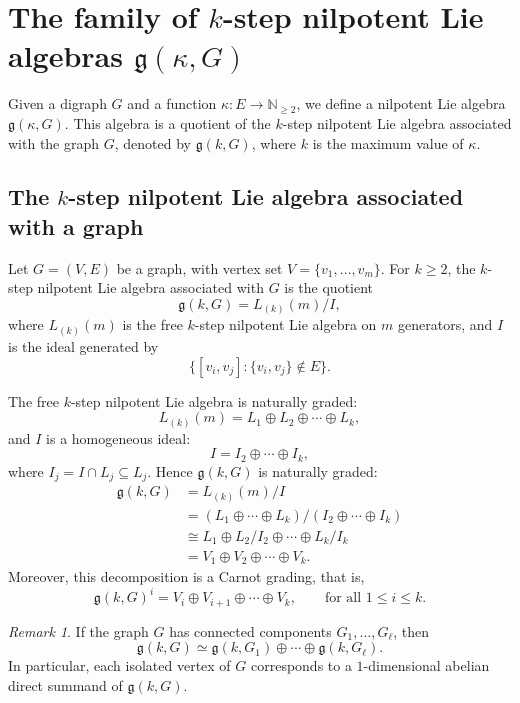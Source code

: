 \documentclass[a4paper,11pt]{amsart}
\theoremstyle{definition}
\theoremstyle{remark}
\newtheorem{remark}[theorem]{Remark}
\numberwithin{equation}{section}
\newcommand{\g}{\mathfrak{g}}
\newcommand{\N}{\mathbb{N}}
\begin{document}
\section{The family of $k$-step nilpotent Lie algebras $\g(\kappa,G)$}

Given a digraph $G$ and a function $\kappa:E\to\N_{\ge 2}$, we define a nilpotent Lie algebra $\g(\kappa,G)$. 
This algebra is a quotient of the $k$-step nilpotent Lie algebra associated with the graph $G$, denoted by $\g(k,G)$, 
where $k$ is the maximum value of $\kappa$.
\subsection{The $k$-step nilpotent Lie algebra associated with a graph}

Let $G=(V,E)$ be a graph, with vertex set $V=\{v_1,\dots,v_m\}$. For $k\ge 2$, the $k$-step nilpotent Lie algebra associated with $G$ is the quotient
\[
\g(k,G)=L_{(k)}(m)/I,
\]
where $L_{(k)}(m)$ is the free $k$-step nilpotent Lie algebra on $m$ generators, and $I$ is the ideal generated by
\[
\{[v_i,v_j]: \{v_i,v_j\}\notin E\}.
\]

The free $k$-step nilpotent Lie algebra is naturally graded:
\[
L_{(k)}(m)=L_1\oplus L_2\oplus\cdots\oplus L_k,
\]
and $I$ is a homogeneous ideal:
\[
I=I_2\oplus\cdots\oplus I_k,
\]
where $I_j=I\cap L_j\subseteq L_j$. Hence $\g(k,G)$ is naturally graded:
\[
\begin{aligned}
\g(k,G)&=L_{(k)}(m)/I\\
&=(L_1\oplus\cdots\oplus L_k)/(I_2\oplus\cdots\oplus I_k)\\
&\cong L_1\oplus L_2/I_2\oplus\cdots\oplus L_k/I_k\\
&=V_1\oplus V_2\oplus\cdots\oplus V_k.
\end{aligned}
\]
Moreover, this decomposition is a Carnot grading, that is,
\[
\g(k,G)^i = V_i\oplus V_{i+1}\oplus\cdots\oplus V_k,
\qquad \text{for all } 1\le i\le k.
\]

\begin{remark}
If the graph $G$ has connected components $G_1,\dots,G_\ell$, then
\[
\g(k,G)\simeq \g(k,G_1)\oplus\cdots\oplus\g(k,G_\ell).
\]
In particular, each isolated vertex of $G$ corresponds to a $1$-dimensional abelian direct summand of $\g(k,G)$.
\end{remark}

\end{document}
